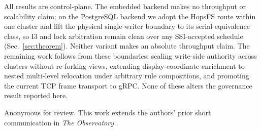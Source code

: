 \documentclass[numberedsection,acmtos]{acmart}
\begin{document}
All results are control-plane. The embedded backend makes no
throughput or scalability claim; on the PostgreSQL backend we adopt the
HopsFS route \citep{hopsfs} within one cluster and lift the physical
single-writer boundary to its serial-equivalence class, so I3 and lock
arbitration remain clean over any SSI-accepted schedule
(Sec.~\ref{sec:theorem}). Neither variant makes an absolute throughput claim.
The remaining work follows from these boundaries: scaling write-side
authority across clusters without re-forking views, extending
display-coordinate enrichment to nested multi-level relocation under arbitrary
rule compositions, and promoting the current TCP frame transport to gRPC.
None of these alters the governance result reported here.

\begin{acks}
Anonymous for review.
This work extends the authors' prior short communication in
\emph{The Observatory} \citep{han2026yourfs}.
\end{acks}
\end{document}
